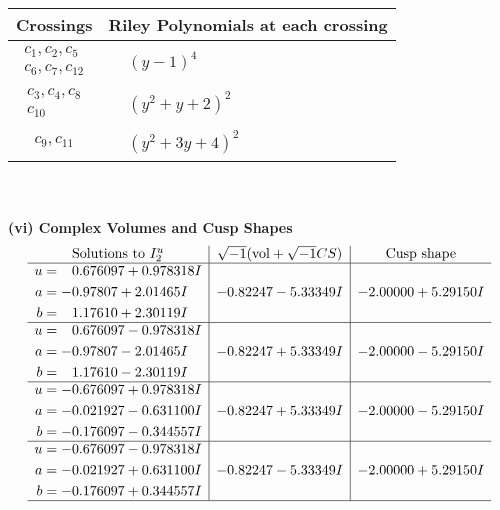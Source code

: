 \documentclass[1p]{elsarticle_modified}
\theoremstyle{definition}
\newcommand{\I}{\sqrt{-1}}
\begin{document}
\begin{tabular}{m{50pt}|m{274pt}}
Crossings & \hspace{64pt}Riley Polynomials at each crossing \\
\hline $$\begin{aligned}c_{1},c_{2},c_{5}\\c_{6},c_{7},c_{12}\end{aligned}$$&$\begin{aligned}
&(y-1)^4
\end{aligned}$\\
\hline $$\begin{aligned}c_{3},c_{4},c_{8}\\c_{10}\end{aligned}$$&$\begin{aligned}
&(y^2+y+2)^2
\end{aligned}$\\
\hline $$\begin{aligned}c_{9},c_{11}\end{aligned}$$&$\begin{aligned}
&(y^2+3 y+4)^2
\end{aligned}$\\
\hline
\end{tabular}\\~\\
\newpage\flushleft \textbf{(vi) Complex Volumes and Cusp Shapes}
$$\begin{array}{c|c|c}  
\text{Solutions to }I^u_{2}& \I (\text{vol} + \sqrt{-1}CS) & \text{Cusp shape}\\
 \hline 
\begin{aligned}
u &= \phantom{-}0.676097 + 0.978318 I \\
a &= -0.97807 + 2.01465 I \\
b &= \phantom{-}1.17610 + 2.30119 I\end{aligned}
 & -0.82247 - 5.33349 I & -2.00000 + 5.29150 I \\ \hline\begin{aligned}
u &= \phantom{-}0.676097 - 0.978318 I \\
a &= -0.97807 - 2.01465 I \\
b &= \phantom{-}1.17610 - 2.30119 I\end{aligned}
 & -0.82247 + 5.33349 I & -2.00000 - 5.29150 I \\ \hline\begin{aligned}
u &= -0.676097 + 0.978318 I \\
a &= -0.021927 - 0.631100 I \\
b &= -0.176097 - 0.344557 I\end{aligned}
 & -0.82247 + 5.33349 I & -2.00000 - 5.29150 I \\ \hline\begin{aligned}
u &= -0.676097 - 0.978318 I \\
a &= -0.021927 + 0.631100 I \\
b &= -0.176097 + 0.344557 I\end{aligned}
 & -0.82247 - 5.33349 I & -2.00000 + 5.29150 I\\
 \hline 
 \end{array}$$\newpage\newpage\renewcommand{\arraystretch}{1}
\end{document}
